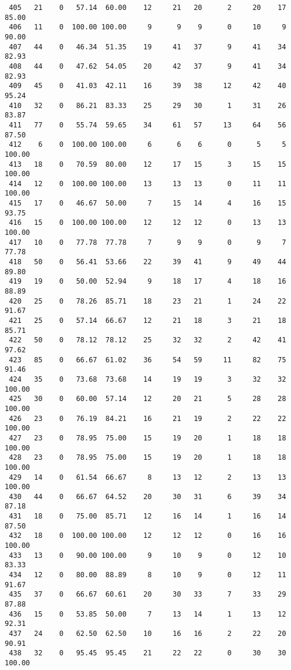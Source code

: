 \begin{verbatim}
 405   21    0   57.14  60.00    12     21   20      2     20    17    85.00
 406   11    0  100.00 100.00     9      9    9      0     10     9    90.00
 407   44    0   46.34  51.35    19     41   37      9     41    34    82.93
 408   44    0   47.62  54.05    20     42   37      9     41    34    82.93
 409   45    0   41.03  42.11    16     39   38     12     42    40    95.24
 410   32    0   86.21  83.33    25     29   30      1     31    26    83.87
 411   77    0   55.74  59.65    34     61   57     13     64    56    87.50
 412    6    0  100.00 100.00     6      6    6      0      5     5   100.00
 413   18    0   70.59  80.00    12     17   15      3     15    15   100.00
 414   12    0  100.00 100.00    13     13   13      0     11    11   100.00
 415   17    0   46.67  50.00     7     15   14      4     16    15    93.75
 416   15    0  100.00 100.00    12     12   12      0     13    13   100.00
 417   10    0   77.78  77.78     7      9    9      0      9     7    77.78
 418   50    0   56.41  53.66    22     39   41      9     49    44    89.80
 419   19    0   50.00  52.94     9     18   17      4     18    16    88.89
 420   25    0   78.26  85.71    18     23   21      1     24    22    91.67
 421   25    0   57.14  66.67    12     21   18      3     21    18    85.71
 422   50    0   78.12  78.12    25     32   32      2     42    41    97.62
 423   85    0   66.67  61.02    36     54   59     11     82    75    91.46
 424   35    0   73.68  73.68    14     19   19      3     32    32   100.00
 425   30    0   60.00  57.14    12     20   21      5     28    28   100.00
 426   23    0   76.19  84.21    16     21   19      2     22    22   100.00
 427   23    0   78.95  75.00    15     19   20      1     18    18   100.00
 428   23    0   78.95  75.00    15     19   20      1     18    18   100.00
 429   14    0   61.54  66.67     8     13   12      2     13    13   100.00
 430   44    0   66.67  64.52    20     30   31      6     39    34    87.18
 431   18    0   75.00  85.71    12     16   14      1     16    14    87.50
 432   18    0  100.00 100.00    12     12   12      0     16    16   100.00
 433   13    0   90.00 100.00     9     10    9      0     12    10    83.33
 434   12    0   80.00  88.89     8     10    9      0     12    11    91.67
 435   37    0   66.67  60.61    20     30   33      7     33    29    87.88
 436   15    0   53.85  50.00     7     13   14      1     13    12    92.31
 437   24    0   62.50  62.50    10     16   16      2     22    20    90.91
 438   32    0   95.45  95.45    21     22   22      0     30    30   100.00

\end{verbatim}
